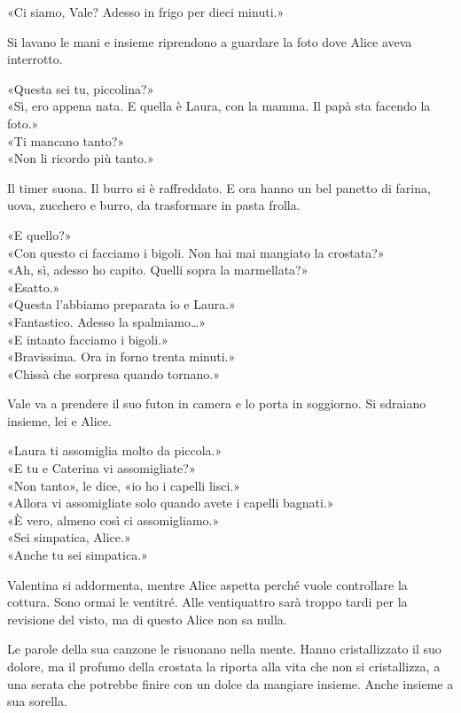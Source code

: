\par\medskip
«Ci siamo, Vale? Adesso in frigo per dieci minuti.»
\par\medskip
Si lavano le mani e insieme riprendono a guardare la foto dove Alice aveva interrotto.
\par\medskip
«Questa sei tu, piccolina?»\\
«Sì, ero appena nata. E quella \`e Laura, con la mamma. Il papà sta facendo la foto.»\\
«Ti mancano tanto?»\\
«Non li ricordo pi\`u tanto.»
\par\medskip
Il timer suona. Il burro si \`e raffreddato.  
E ora hanno un bel panetto di farina, uova, zucchero e burro,
 da trasformare in pasta frolla.
\par\medskip
«E quello?»\\
«Con questo ci facciamo i bigoli. Non hai mai mangiato la crostata?»\\
«Ah, sì, adesso ho capito. Quelli sopra la marmellata?»\\
«Esatto.»\\
«Questa l’abbiamo preparata io e Laura.»\\
«Fantastico. Adesso la spalmiamo…»\\
«E intanto facciamo i bigoli.»\\
«Bravissima. Ora in forno trenta minuti.»\\
«Chissà che sorpresa quando tornano.»
\par\medskip
Vale va a prendere il suo futon in camera e lo porta in soggiorno.  
Si sdraiano insieme, lei e Alice.
\par\medskip
«Laura ti assomiglia molto da piccola.»\\
«E tu e Caterina vi assomigliate?»\\
«Non tanto», le dice, «io ho i capelli lisci.»\\
«Allora vi assomigliate solo quando avete i capelli bagnati.»\\
«\`E vero, almeno cos\`i ci assomigliamo.»\\
«Sei simpatica, Alice.»\\
«Anche tu sei simpatica.»
\par\medskip
Valentina si addormenta, mentre Alice aspetta perch\'e vuole controllare la cottura.
Sono ormai le ventitré. Alle ventiquattro sarà troppo tardi per la revisione del visto,
ma di questo Alice non sa nulla.

Le parole della sua canzone le risuonano nella mente. Hanno cristallizzato il suo dolore,
ma il profumo della crostata la riporta alla vita che non si cristallizza,
a una serata che potrebbe finire con un dolce da mangiare insieme.
Anche insieme a sua sorella.
